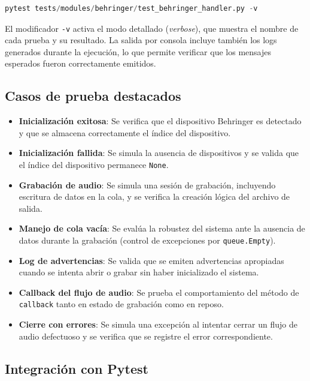\begin{lstlisting}[language={python}]
pytest tests/modules/behringer/test_behringer_handler.py -v 
\end{lstlisting}



El modificador \texttt{-v} activa el modo detallado (\textit{verbose}), que muestra el nombre de cada prueba y su resultado. La salida por consola incluye también los logs generados durante la ejecución, lo que permite verificar que los mensajes esperados fueron correctamente emitidos.

\subsection{Casos de prueba destacados}

\begin{itemize} \item \textbf{Inicialización exitosa}: Se verifica que el dispositivo Behringer es detectado y que se almacena correctamente el índice del dispositivo. \item \textbf{Inicialización fallida}: Se simula la ausencia de dispositivos y se valida que el índice del dispositivo permanece \texttt{None}. \item \textbf{Grabación de audio}: Se simula una sesión de grabación, incluyendo escritura de datos en la cola, y se verifica la creación lógica del archivo de salida. \item \textbf{Manejo de cola vacía}: Se evalúa la robustez del sistema ante la ausencia de datos durante la grabación (control de excepciones por \texttt{queue.Empty}). \item \textbf{Log de advertencias}: Se valida que se emiten advertencias apropiadas cuando se intenta abrir o grabar sin haber inicializado el sistema. \item \textbf{Callback del flujo de audio}: Se prueba el comportamiento del método de \texttt{callback} tanto en estado de grabación como en reposo. \item \textbf{Cierre con errores}: Se simula una excepción al intentar cerrar un flujo de audio defectuoso y se verifica que se registre el error correspondiente. \end{itemize}

\subsection{Integración con Pytest}

